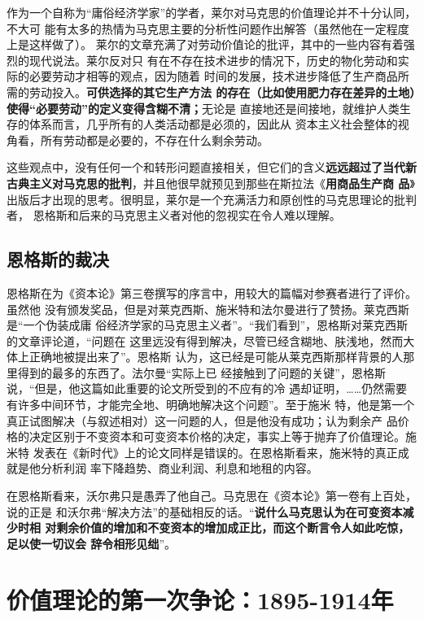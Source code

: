 作为一个自称为“庸俗经济学家”的学者，莱尔对马克思的价值理论并不十分认同，不大可
能有太多的热情为马克思主要的分析性问题作出解答（虽然他在一定程度上是这样做了）。
莱尔的文章充满了对劳动价值论的批评，其中的一些内容有着强烈的现代说法。莱尔反对只
有在不存在技术进步的情况下，历史的物化劳动和实际的必要劳动才相等的观点，因为随着
时间的发展，技术进步降低了生产商品所需的劳动投入。\textbf{可供选择的其它生产方法
  的存在（比如使用肥力存在差异的土地）使得“必要劳动”的定义变得含糊不清；}无论是
直接地还是间接地，就维护人类生存的体系而言，几乎所有的人类活动都是必须的，因此从
资本主义社会整体的视角看，所有劳动都是必要的，不存在什么剩余劳动。

这些观点中，没有任何一个和转形问题直接相关，但它们的含义\textbf{远远超过了当代新
  古典主义对马克思的批判}，并且他很早就预见到那些在斯拉法《\textbf{用商品生产商
  品}》出版后才出现的思考。很明显，莱尔是一个充满活力和原创性的马克思理论的批判者，
恩格斯和后来的马克思主义者对他的忽视实在令人难以理解。

\section{恩格斯的裁决}

恩格斯在为《资本论》第三卷撰写的序言中，用较大的篇幅对参赛者进行了评价。虽然他
没有颁发奖品，但是对莱克西斯、施米特和法尔曼进行了赞扬。莱克西斯是“一个伪装成庸
俗经济学家的马克思主义者”。“我们看到”，恩格斯对莱克西斯的文章评论道，“问题在
这里远没有得到解决，尽管已经含糊地、肤浅地，然而大体上正确地被提出来了”。恩格斯
认为，这已经是可能从莱克西斯那样背景的人那里得到的最多的东西了。法尔曼“实际上已
经接触到了问题的关键”，恩格斯说，“但是，他这篇如此重要的论文所受到的不应有的冷
遇却证明，……仍然需要有许多中间环节，才能完全地、明确地解决这个问题”。至于施米
特，他是第一个真正试图解决（与叙述相对）这一问题的人，但是他没有成功；认为剩余产
品价格的决定区别于不变资本和可变资本价格的决定，事实上等于抛弃了价值理论。施米特
发表在《新时代》上的论文同样是错误的。在恩格斯看来，施米特的真正成就是他分析利润
率下降趋势、商业利润、利息和地租的内容。

在恩格斯看来，沃尔弗只是愚弄了他自己。马克思在《资本论》第一卷有上百处，说的正是
和沃尔弗“解决方法”的基础相反的话。“\textbf{说什么马克思认为在可变资本减少时相
  对剩余价值的增加和不变资本的增加成正比，而这个断言令人如此吃惊，足以使一切议会
  辞令相形见绌}”。

\chapter{价值理论的第一次争论：1895-1914年}
\label{chap:1stzhenglun}

